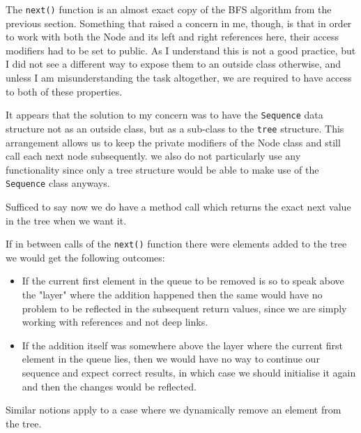 \documentclass[a4paper,11pt]{article}
\begin{document}
The {\tt next()} function is an almost exact copy of the BFS algorithm from the previous section. Something that raised a concern in me, though, is that in order to work with both the Node and its left and right references here, their access modifiers had to be set to public. As I understand this is not a good practice, but I did not see a different way to expose them to an outside class otherwise, and unless I am misunderstanding the task altogether, we are required to have access to both of these properties. 

It appears that the solution to my concern was to have the {\tt Sequence} data structure not as an outside class, but as a sub-class to the {\tt tree} structure. This arrangement allows us to keep the private modifiers of the Node class and still call each next node subsequently. we also do not particularly use any functionality since only a tree structure would be able to make use of the {\tt Sequence} class anyways.

Sufficed to say now we do have a method call which returns the exact next value in the tree when we want it. 

If in between calls of the {\tt next()} function there were elements added to the tree we would get the following outcomes: 

\begin{itemize}
\item If the current first element in the queue to be removed is so to speak above the "layer" where the addition happened then the same would have no problem to be reflected in the subsequent return values, since we are simply working with references and not deep links.
\item If the addition itself was somewhere above the layer where the current first element in the queue lies, then we would have no way to continue our sequence and expect correct results, in which case we should initialise it again and then the changes would be reflected.
\end{itemize} 

Similar notions apply to a case where we dynamically remove an element from the tree.
\end{document}
